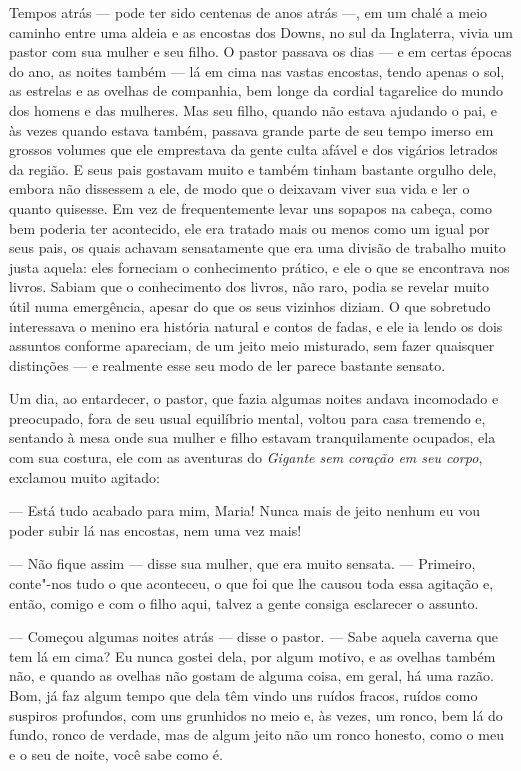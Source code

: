 Tempos atrás --- pode ter sido centenas de anos atrás ---, em um chalé a
meio caminho entre uma aldeia e as encostas dos Downs, no sul da
Inglaterra, vivia um pastor com sua mulher e seu filho. O pastor
passava os dias --- e em certas épocas do ano, as noites também --- lá em
cima nas vastas encostas, tendo apenas o sol, as estrelas e as
ovelhas de companhia, bem longe da cordial tagarelice do mundo dos
homens e das mulheres. Mas seu filho, quando não estava ajudando o
pai, e às vezes quando estava também, passava grande parte de seu tempo
imerso em grossos volumes que ele emprestava da gente culta afável e
dos vigários letrados da região. E seus pais gostavam muito e
também tinham bastante orgulho dele, embora não dissessem
a ele, de modo que o deixavam viver sua vida e ler o quanto quisesse.
Em vez de frequentemente levar uns sopapos na cabeça, como bem
poderia ter acontecido, ele era tratado mais ou menos como um igual
por seus pais, os quais achavam sensatamente que era uma divisão de
trabalho muito justa aquela: eles forneciam o conhecimento prático, e
ele o que se encontrava nos livros. Sabiam que o conhecimento dos
livros, não raro, podia se revelar muito útil numa emergência, apesar
do que os seus vizinhos diziam. O que sobretudo interessava o menino
era história natural e contos de fadas, e ele ia lendo os dois
assuntos conforme apareciam, de um jeito meio misturado, sem
fazer quaisquer distinções --- e realmente esse seu modo de ler parece
bastante sensato.

Um dia, ao entardecer, o pastor, que fazia algumas noites andava
incomodado e preocupado, fora de seu usual equilíbrio mental, voltou
para casa tremendo e, sentando à mesa onde sua mulher e filho
estavam tranquilamente ocupados, ela com sua costura, ele com as
aventuras do \textit{Gigante sem coração em seu corpo}, exclamou muito
agitado:

--- Está tudo acabado para mim, Maria! Nunca mais de jeito nenhum eu vou
poder subir lá nas encostas, nem uma vez mais!

--- Não fique assim --- disse sua mulher, que era muito sensata. ---
Primeiro, conte"-nos tudo o que aconteceu, o que foi que lhe causou
toda essa agitação e, então, comigo e com o filho aqui, talvez a gente
consiga esclarecer o assunto.

--- Começou algumas noites atrás --- disse o pastor. --- Sabe aquela caverna
que tem lá em cima? Eu nunca gostei dela, por algum motivo, e as
ovelhas também não, e quando as ovelhas não gostam de alguma coisa, em
geral, há uma razão. Bom, já faz algum tempo que dela têm vindo uns
ruídos fracos, ruídos como suspiros profundos, com uns grunhidos no
meio e, às vezes, um ronco, bem lá do fundo, ronco de verdade, mas de
algum jeito não um ronco honesto, como o meu e o seu de noite, você
sabe como é.

